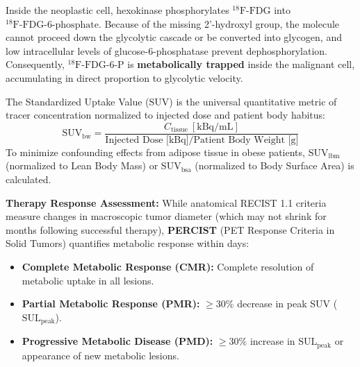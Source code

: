 \documentclass[11pt,a4paper]{article}
\begin{document}
Inside the neoplastic cell, hexokinase phosphorylates $^{18}\text{F}\text{-FDG}$ into $^{18}\text{F}\text{-FDG-6-phosphate}$. Because of the missing 2'-hydroxyl group, the molecule cannot proceed down the glycolytic cascade or be converted into glycogen, and low intracellular levels of glucose-6-phosphatase prevent dephosphorylation. Consequently, $^{18}\text{F}\text{-FDG-6-P}$ is \textbf{metabolically trapped} inside the malignant cell, accumulating in direct proportion to glycolytic velocity.

\begin{clinicalpearl}
The Standardized Uptake Value ($\text{SUV}$) is the universal quantitative metric of tracer concentration normalized to injected dose and patient body habitus:
\begin{equation}
    \text{SUV}_{\text{bw}} = \frac{C_{\text{tissue}} \ [\text{kBq/mL}]}{\text{Injected Dose [kBq]} / \text{Patient Body Weight [g]}}
\end{equation}
To minimize confounding effects from adipose tissue in obese patients, $\text{SUV}_{\text{lbm}}$ (normalized to Lean Body Mass) or $\text{SUV}_{\text{bsa}}$ (normalized to Body Surface Area) is calculated.

\textbf{Therapy Response Assessment:} While anatomical RECIST 1.1 criteria measure changes in macroscopic tumor diameter (which may not shrink for months following successful therapy), \textbf{PERCIST} (PET Response Criteria in Solid Tumors) quantifies metabolic response within days:
\begin{itemize}
    \item \textbf{Complete Metabolic Response (CMR):} Complete resolution of metabolic uptake in all lesions.
    \item \textbf{Partial Metabolic Response (PMR):} $\ge 30\%$ decrease in peak SUV ($\text{SUL}_{\text{peak}}$).
    \item \textbf{Progressive Metabolic Disease (PMD):} $\ge 30\%$ increase in $\text{SUL}_{\text{peak}}$ or appearance of new metabolic lesions.
\end{itemize}
\end{clinicalpearl}
\end{document}

